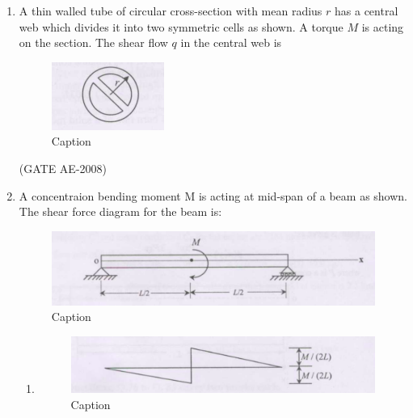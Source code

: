 \documentclass[journal,12pt,onecolumn]{IEEEtran}
\theoremstyle{remark}
\begin{document}
\begin{enumerate}
    \quad
    
\item A thin walled tube of circular cross-section with mean radius $r$ has a central web which divides it into two symmetric cells as shown. A torque $M$ is acting on the section. The shear flow $q$ in the central web is
\begin{figure}[H]
    \centering
    \includegraphics[width=0.5\linewidth]{figs/Screenshot from 2025-08-08 12-34-18.png}
    \caption{Caption}
    \label{fig:placeholder}
\end{figure}
\begin{enumerate}
\end{enumerate}
\hfill(GATE AE-2008)

\quad 

\item  A concentraion bending moment M is acting at mid-span of a beam as shown. The shear force diagram for the beam is:
\begin{figure}[H]
    \centering
    \includegraphics[width=0.5\linewidth]{figs/Screenshot from 2025-08-08 12-52-57.png}
    \caption{Caption}
    \label{fig:placeholder}
\end{figure}
\begin{enumerate}
    \item 
    \begin{figure}[H]
        \centering
        \includegraphics[width=0.5\linewidth]{figs/Screenshot from 2025-08-08 12-59-04.png}
        \caption{Caption}
    \label{fig:placeholder}
    \end{figure} 
    

\end{enumerate}
\end{enumerate}
\end{document}
